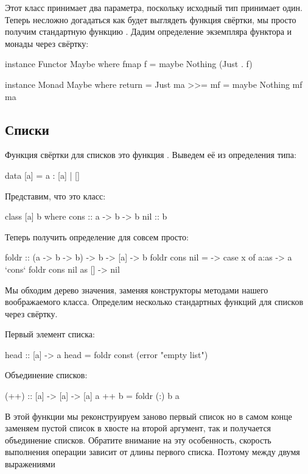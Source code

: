 Этот класс принимает два параметра, поскольку исходный тип 
принимает один. Теперь несложно догадаться как будет выглядеть функция
свёртки, мы просто получим стандартную функцию . Дадим
определение экземпляра функтора и монады через свёртку:


\begin{code}
instance Functor Maybe where
    fmap f = maybe Nothing (Just . f)

instance Monad Maybe where
    return      = Just
    ma >>= mf   = maybe Nothing mf ma
\end{code}

\subsection{Списки}

Функция свёртки для списков это функция . Выведем её из
определения типа:


\begin{code}
data [a] = a : [a] | []
\end{code}

Представим, что это класс:


\begin{code}
class [a] b where
    cons    :: a -> b -> b
    nil     :: b
\end{code}

Теперь получить определение для  совсем просто:


\begin{code}
foldr :: (a -> b -> b) -> b -> [a] -> b
foldr cons nil = \x -> case x of
    a:as    -> a `cons` foldr cons nil as
    []      -> nil    
\end{code}

Мы обходим дерево значения, заменяя конструкторы методами нашего
воображаемого класса. Определим несколько стандартных функций для
списков через свёртку.

Первый элемент списка:


\begin{code}
head :: [a] -> a
head = foldr const (error "empty list")
\end{code}

Объединение списков:


\begin{code}
(++) :: [a] -> [a] -> [a]
a ++ b = foldr (:) b a
\end{code}

В этой функции мы реконструируем заново первый список но в самом конце
заменяем пустой список в хвосте  на второй аргумент, так и
получается объединение списков. Обратите внимание на эту особенность,
скорость выполнения операции \In{(++)} зависит от длины первого списка.
Поэтому между двумя выражениями


